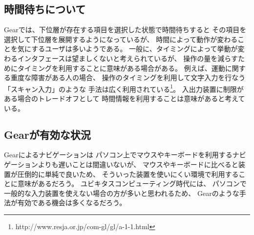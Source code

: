 \documentclass[twoside]{wiss}
\def\GEAR{\textsf{Gear}}
\begin{document}
% 


\subsection{時間待ちについて}

{\GEAR}では、下位層が存在する項目を選択した状態で時間待ちすると
その項目を選択して下位層を展開するようになっているが、
時間によって動作が変わることを気にするユーザは多いようである。
%
一般に、タイミングによって挙動が変わるインタフェースは望ましくないと考えられているが、
操作の量を減らすためにタイミングを利用することに意味がある場合がある。
例えば、運動に関する重度な障害がある人の場合、
操作のタイミングを利用して文字入力を行なう「スキャン入力」のような
手法は広く利用されている\footnote{
  \textsf{http://www.resja.or.jp/com-gl/gl/a-1-1.html}
}。
入出力装置に制限がある場合のトレードオフとして
時間情報を利用することは意味があると考えている。


% 

\subsection{{\GEAR}が有効な状況}

{\GEAR}によるナビゲーションは
パソコン上でマウスやキーボードを利用するナビゲーションよりも遅いことは間違いないが、
マウスやキーボードに比べると装置が圧倒的に単純で良いため、
そういった装置を使いにくい環境で利用することに意味があるだろう。
ユビキタスコンピューティング時代には、
パソコンで一般的な入力装置を使えない場合の方が多いと思われるため、
{\GEAR}のような手法が有効である機会は多くなるだろう。
\end{document}
